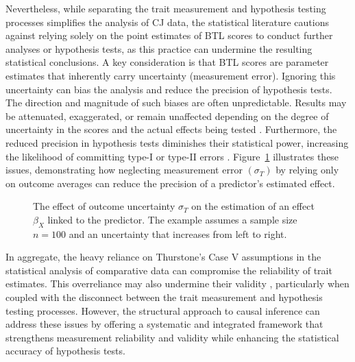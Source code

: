 \documentclass[
  authoryear,
  review,
  1p]{elsarticle}
\begin{document}
Nevertheless, while separating the trait measurement and hypothesis
testing processes simplifies the analysis of CJ data, the statistical
literature cautions against relying solely on the point estimates of BTL
scores to conduct further analyses or hypothesis tests, as this practice
can undermine the resulting statistical conclusions. A key consideration
is that BTL scores are parameter estimates that inherently carry
uncertainty (measurement error). Ignoring this uncertainty can bias the
analysis and reduce the precision of hypothesis tests. The direction and
magnitude of such biases are often unpredictable. Results may be
attenuated, exaggerated, or remain unaffected depending on the degree of
uncertainty in the scores and the actual effects being tested
\citetext{\citealp[pp.~25]{Kline_et_al_2023}; \citealp[pp.~137]{Hoyle_et_al_2023}}.
Furthermore, the reduced precision in hypothesis tests diminishes their
statistical power, increasing the likelihood of committing type-I or
type-II errors \citep{McElreath_2020}.
Figure~\ref{fig-measurement_error} illustrates these issues,
demonstrating how neglecting measurement error \((\sigma_{T})\) by
relying only on outcome averages can reduce the precision of a
predictor's estimated effect.

\begin{figure}


\caption{\label{fig-measurement_error}The effect of outcome uncertainty
\(\sigma_{T}\) on the estimation of an effect \(\beta_{X}\) linked to
the predictor. The example assumes a sample size \(n=100\) and an
uncertainty that increases from left to right.}

\end{figure}%

In aggregate, the heavy reliance on Thurstone's Case V assumptions in
the statistical analysis of comparative data can compromise the
reliability of trait estimates. This overreliance may also undermine
their validity \citep[pp.~2]{Perron_et_al_2015}, particularly when
coupled with the disconnect between the trait measurement and hypothesis
testing processes. However, the structural approach to causal inference
can address these issues by offering a systematic and integrated
framework that strengthens measurement reliability and validity while
enhancing the statistical accuracy of hypothesis tests.
\end{document}
